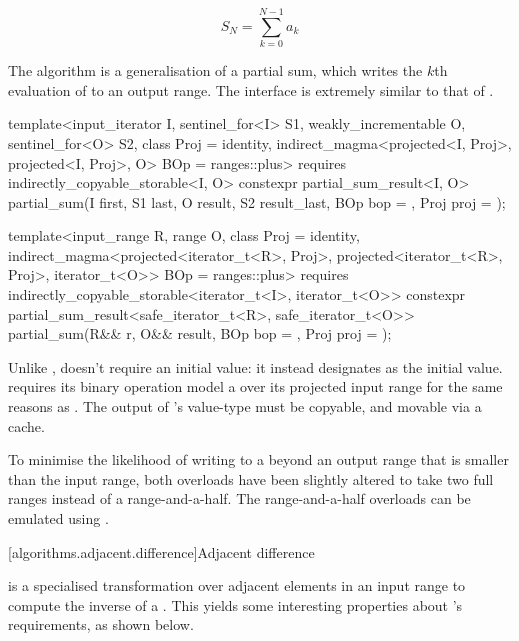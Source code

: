 $$S_N = \sum_{k = 0}^{N - 1} a_k$$

The \Cpp{} algorithm  is a generalisation of a partial sum, which writes the
$k$th evaluation of  to an output range. The interface is extremely similar to
that of .

\begin{codeblock}
template<input_iterator I, sentinel_for<I> S1, weakly_incrementable O, sentinel_for<O> S2,
         class Proj = identity,
         indirect_magma<projected<I, Proj>, projected<I, Proj>, O> BOp = ranges::plus>
  requires indirectly_copyable_storable<I, O>
constexpr partial_sum_result<I, O>
  partial_sum(I first, S1 last, O result, S2 result_last, BOp bop = {}, Proj proj = {});

template<input_range R, range O, class Proj = identity,
         indirect_magma<projected<iterator_t<R>, Proj>,
                        projected<iterator_t<R>, Proj>,
                        iterator_t<O>> BOp = ranges::plus>
  requires indirectly_copyable_storable<iterator_t<I>, iterator_t<O>>
constexpr partial_sum_result<safe_iterator_t<R>, safe_iterator_t<O>>
  partial_sum(R&& r, O&& result, BOp bop = {}, Proj proj = {});
\end{codeblock}

Unlike ,  doesn't require an initial value: it instead
designates  as the initial value.  requires its
binary operation model a  over its projected input range for the same reasons as
. The output of 's value-type must be copyable, and movable via
a cache.


To minimise the likelihood of writing to a beyond an output range that is smaller than the input
range, both overloads have been slightly altered to take two full ranges instead of a
range-and-a-half. The range-and-a-half overloads can be emulated using .

[algorithms.adjacent.difference]{Adjacent difference}

 is a specialised transformation over adjacent elements in an input range
to compute the inverse of a  . This yields some
interesting properties about 's requirements, as shown below.

